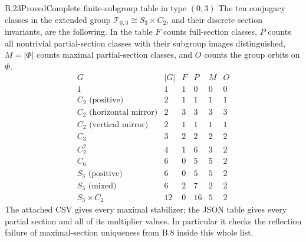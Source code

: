 \begin{claim}{B.23}{Proved}{Complete finite-subgroup table in type $(0,3)$}
The ten conjugacy classes in the extended group
$\mathcal T_{0,3}\cong S_3\times C_2$, and their discrete section invariants,
are the following. In the table $F$ counts full-section classes, $P$ counts all
nontrivial partial-section classes with their subgroup images distinguished,
$M=|\Phi|$ counts maximal partial-section classes, and $O$ counts the group
orbits on $\Phi$.
\[
\begin{array}{lrrrrr}
 G&|G|&F&P&M&O\\\hline
 1&1&1&0&0&0\\
 C_2\text{ (positive)}&2&1&1&1&1\\
 C_2\text{ (horizontal mirror)}&2&3&3&3&3\\
 C_2\text{ (vertical mirror)}&2&1&1&1&1\\
 C_3&3&2&2&2&2\\
 C_2^2&4&1&6&3&2\\
 C_6&6&0&5&5&2\\
 S_3\text{ (positive)}&6&0&5&5&2\\
 S_3\text{ (mixed)}&6&2&7&2&2\\
 S_3\times C_2&12&0&16&5&2
\end{array}
\]
The attached CSV gives every maximal stabilizer; the JSON table gives every
partial section and all of its multiplier values. In particular it checks the
reflection failure of maximal-section uniqueness from B.8 inside this whole list.
\end{claim}

